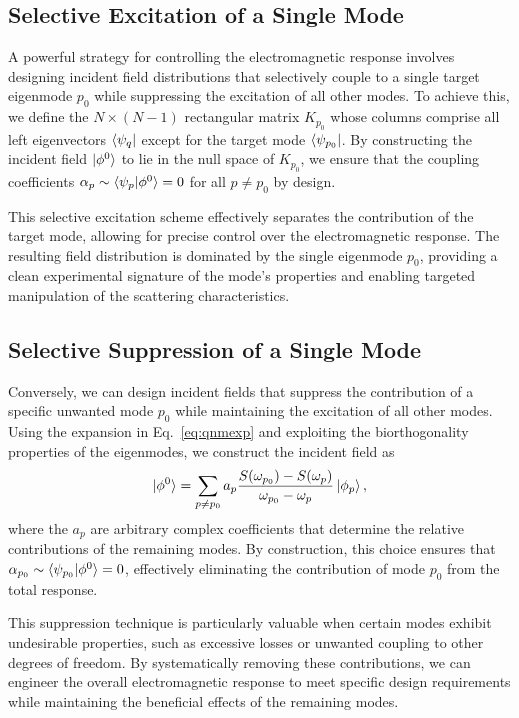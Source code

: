 \documentclass[%
 reprint,
 amsmath,amssymb,
 aps,
 prb,
]{revtex4-2}
\newcommand{\corrections}[1]{#1}
\begin{document}
\subsection{Selective Excitation of a Single Mode}

\corrections{A powerful strategy for controlling the electromagnetic response involves designing incident field distributions that selectively couple to a single target eigenmode $p_0$ while suppressing the excitation of all other modes.} To achieve this, we define the $N \times (N-1)$ rectangular matrix $K_{p_0}$ whose columns comprise all left eigenvectors $\bra{\psi_q}$ except for the target mode $\bra{\psi_{p_0}}$. By constructing the incident field $\ket{\phi^0}$ to lie in the null space of $K_{p_0}$, we ensure that the coupling coefficients $\alpha_p \sim \braket{\psi_p | \phi^0} = 0$ for all $p \neq p_0$ by design.



This selective excitation scheme effectively \corrections{separates} the contribution of the target mode, allowing for precise control over the electromagnetic response. The resulting field distribution is dominated by the single eigenmode $p_0$, providing a clean experimental signature of the mode's properties and enabling targeted manipulation of the scattering characteristics.

\subsection{Selective Suppression of a Single Mode}

Conversely, we can design incident fields that suppress the contribution of a specific unwanted mode $p_0$ while maintaining the excitation of all other modes. Using the expansion in Eq.~\eqref{eq:qnmexp} and exploiting the biorthogonality properties of the eigenmodes, we construct the incident field as
\begin{equation}
\ket{\phi^0} = \sum_{p \neq p_0} a_p \frac{S(\omega_{p_0}) - S(\omega_p)}{\omega_{p_0} - \omega_p} \ket{\phi_p},
\end{equation}
where the $a_p$ are arbitrary complex coefficients that determine the relative contributions of the remaining modes. By construction, this choice ensures that $\alpha_{p_0} \sim \braket{\psi_{p_0} | \phi^0} = 0$, effectively eliminating the contribution of mode $p_0$ from the total response.

This suppression technique is particularly valuable when certain modes exhibit undesirable properties, such as excessive losses or unwanted coupling to other degrees of freedom. By systematically removing these contributions, we can engineer the overall electromagnetic response to meet specific design requirements while maintaining the beneficial effects of the remaining modes.
\end{document}
